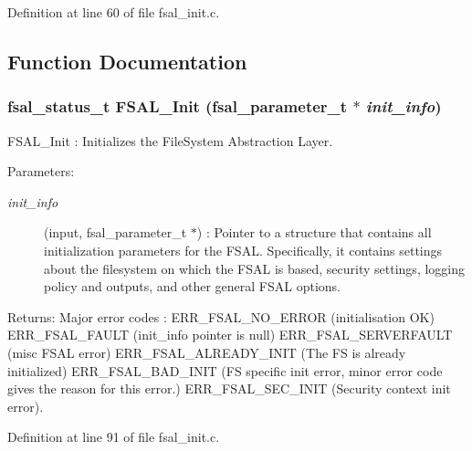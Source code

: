 Definition at line 60 of file fsal\_\-init.c.

\subsection{Function Documentation}
\subsubsection[{FSAL\_\-Init}]{\setlength{\rightskip}{0pt plus 5cm}fsal\_\-status\_\-t FSAL\_\-Init (fsal\_\-parameter\_\-t $\ast$ {\em init\_\-info})}\label{fsal__init_8c_0be44bf9d728985f8631b3aa8911b36f}


FSAL\_\-Init : Initializes the FileSystem Abstraction Layer.

\begin{Desc}
\item[Parameters:]
\begin{description}
\item[{\em init\_\-info}](input, fsal\_\-parameter\_\-t $\ast$) : Pointer to a structure that contains all initialization parameters for the FSAL. Specifically, it contains settings about the filesystem on which the FSAL is based, security settings, logging policy and outputs, and other general FSAL options.\end{description}
\end{Desc}
\begin{Desc}
\item[Returns:]Major error codes : ERR\_\-FSAL\_\-NO\_\-ERROR (initialisation OK) ERR\_\-FSAL\_\-FAULT (init\_\-info pointer is null) ERR\_\-FSAL\_\-SERVERFAULT (misc FSAL error) ERR\_\-FSAL\_\-ALREADY\_\-INIT (The FS is already initialized) ERR\_\-FSAL\_\-BAD\_\-INIT (FS specific init error, minor error code gives the reason for this error.) ERR\_\-FSAL\_\-SEC\_\-INIT (Security context init error). \end{Desc}


Definition at line 91 of file fsal\_\-init.c.